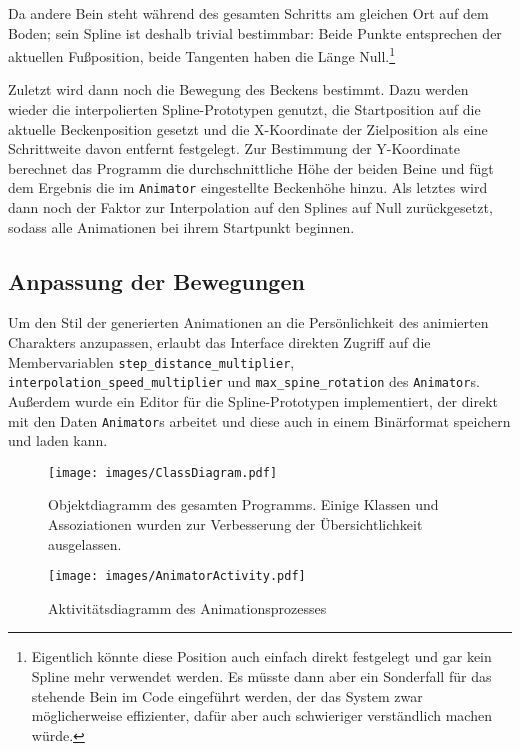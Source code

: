 Da andere Bein steht während des gesamten Schritts am gleichen Ort auf dem Boden; sein Spline ist deshalb trivial bestimmbar: Beide Punkte entsprechen der aktuellen Fußposition, beide Tangenten haben die Länge Null.\footnote{Eigentlich könnte diese Position auch einfach direkt festgelegt und gar kein Spline mehr verwendet werden. Es müsste dann aber ein Sonderfall für das stehende Bein im Code eingeführt werden, der das System zwar möglicherweise effizienter, dafür aber auch schwieriger verständlich machen würde.}

Zuletzt wird dann noch die Bewegung des Beckens bestimmt. Dazu werden wieder die interpolierten Spline-Prototypen genutzt, die Startposition auf die aktuelle Beckenposition gesetzt und die X-Koordinate der Zielposition als eine Schrittweite davon entfernt festgelegt. Zur Bestimmung der Y-Koordinate berechnet das Programm die durchschnittliche Höhe der beiden Beine und fügt dem Ergebnis die im \lstinline{Animator} eingestellte Beckenhöhe hinzu. Als letztes wird dann noch der Faktor zur Interpolation auf den Splines auf Null zurückgesetzt, sodass alle Animationen bei ihrem Startpunkt beginnen.

\subsection{Anpassung der Bewegungen}
Um den Stil der generierten Animationen an die Persönlichkeit des animierten Charakters anzupassen, erlaubt das Interface direkten Zugriff auf die Membervariablen \lstinline{step_distance_multiplier}, \lstinline{interpolation_speed_multiplier} und \lstinline{max_spine_rotation} des \lstinline{Animator}s. Außerdem wurde ein Editor für die Spline-Prototypen implementiert, der direkt mit den Daten \lstinline{Animator}s arbeitet und diese auch in einem Binärformat speichern und laden kann.

\begin{landscape}
    \begin{figure}
        \texttt{[image: images/ClassDiagram.pdf]}
        \caption{Objektdiagramm des gesamten Programms. Einige Klassen und Assoziationen wurden zur Verbesserung der Übersichtlichkeit ausgelassen.}
        \label{uml_classes}
    \end{figure}
\end{landscape}

\begin{figure}
    \centering
    \texttt{[image: images/AnimatorActivity.pdf]}
    \caption{Aktivitätsdiagramm des Animationsprozesses}
    \label{uml_activity}
\end{figure}